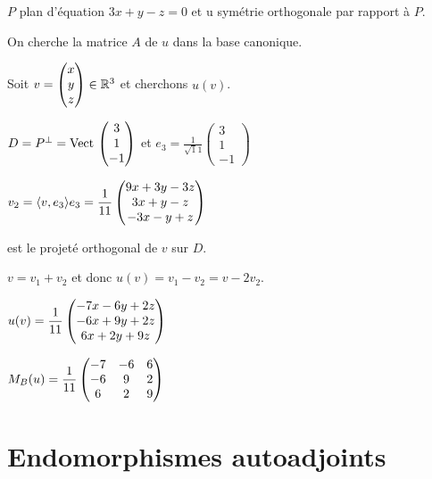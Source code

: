 \begin{exemple}
    $P$ plan d'équation $3x + y - z = 0$ et u symétrie orthogonale par rapport à $P$.

    On cherche la matrice $A$ de $u$ dans la base canonique. 

    Soit $v = \begin{pmatrix}
        x \\ y \\ z
    \end{pmatrix} \in \mathbb{R}^3$ et cherchons $u(v)$. 

    $D = P^\perp = \operatorname{Vect} \, \begin{pmatrix}
        3 \\ 1 \\ -1
    \end{pmatrix}$ et $e_3 = \frac 1 {\sqrt 11} \begin{pmatrix}
        3 \\ 1 \\ -1
    \end{pmatrix}$

    $\displaystyle v_2 = \langle v, e_3 \rangle e_3 = \frac 1 {11} \begin{pmatrix}
        9x + 3y - 3z \\ 3x + y - z \\ -3x - y + z
    \end{pmatrix}$

    est le projeté orthogonal de $v$ sur $D$. 

    $v = v_1 + v_2$ et donc $u(v) = v_1 - v_2 = v - 2 v_2$.

    $u(v) = \displaystyle \frac 1 {11} \begin{pmatrix}
        -7 x - 6y + 2z \\
        -6x + 9y + 2z \\
        6x + 2y + 9z
    \end{pmatrix}$

    $M_B (u) = \displaystyle \frac 1 {11} \begin{pmatrix}
        -7 & -6 & 6 \\
        -6 & 9 & 2 \\
        6 & 2 & 9
    \end{pmatrix}$
\end{exemple}

\section{Endomorphismes autoadjoints}


